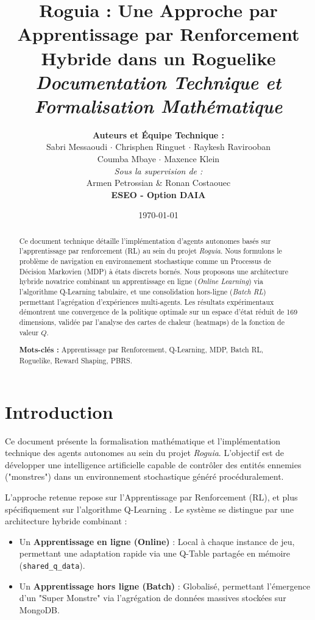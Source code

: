 \documentclass[12pt,a4paper]{article}
\title{
    \vspace{2cm}
    \textbf{\Huge Roguia : Une Approche par Apprentissage par Renforcement Hybride dans un Roguelike} \\ [1cm]
    \large \textit{Documentation Technique et Formalisation Mathématique}
}
\author{
    \textbf{Auteurs et Équipe Technique :} \\[0.2cm]
    Sabri Messaoudi $\cdot$ Chrisphen Ringuet $\cdot$ Raykesh Ravirooban \\
    Coumba Mbaye $\cdot$ Maxence Klein \\[0.5cm]
    \small \textit{Sous la supervision de :} \\
    \small Armen Petrossian \& Ronan Costaouec \\[0.5cm]
    \textbf{ESEO - Option DAIA}
}
\date{\today}
\begin{document}
\maketitle
\thispagestyle{empty}

\begin{abstract}
    \noindent Ce document technique détaille l'implémentation d'agents autonomes basés sur l'apprentissage par renforcement (RL) au sein du projet \textit{Roguia}. Nous formulons le problème de navigation en environnement stochastique comme un Processus de Décision Markovien (MDP) à états discrets bornés. Nous proposons une architecture hybride novatrice combinant un apprentissage en ligne (\textit{Online Learning}) via l'algorithme Q-Learning tabulaire, et une consolidation hors-ligne (\textit{Batch RL}) permettant l'agrégation d'expériences multi-agents. Les résultats expérimentaux démontrent une convergence de la politique optimale sur un espace d'état réduit de 169 dimensions, validée par l'analyse des cartes de chaleur (heatmaps) de la fonction de valeur $Q$.
    
    \vspace{0.5cm}
    \noindent \textbf{Mots-clés :} Apprentissage par Renforcement, Q-Learning, MDP, Batch RL, Roguelike, Reward Shaping, PBRS.
\end{abstract}

\newpage

\tableofcontents
\newpage

\section{Introduction}
Ce document présente la formalisation mathématique et l'implémentation technique des agents autonomes au sein du projet \textit{Roguia}. L'objectif est de développer une intelligence artificielle capable de contrôler des entités ennemies ("monstres") dans un environnement stochastique généré procéduralement.

L'approche retenue repose sur l'Apprentissage par Renforcement (RL), et plus spécifiquement sur l'algorithme Q-Learning \cite{watkins1989learning}. Le système se distingue par une architecture hybride combinant :
\begin{itemize}
    \item Un \textbf{Apprentissage en ligne (Online)} : Local à chaque instance de jeu, permettant une adaptation rapide via une Q-Table partagée en mémoire (\texttt{shared\_q\_data}).
    \item Un \textbf{Apprentissage hors ligne (Batch)} : Globalisé, permettant l'émergence d'un "Super Monstre" via l'agrégation de données massives stockées sur MongoDB.
\end{itemize}
\end{document}
